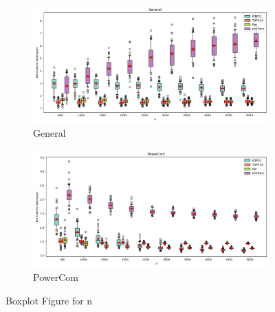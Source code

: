 \documentclass{article}
\begin{document}
\begin{figure}[htbp]
\\[2ex]
\begin{subfigure}[b]{0.32\textwidth}\includegraphics[width=\textwidth]{Results/n/n_General_boxplot}\caption{General}\label{fig:boxplot_figures_n_General}\end{subfigure}
\hfill
\begin{subfigure}[b]{0.32\textwidth}\includegraphics[width=\textwidth]{Results/n/n_PowerCom_boxplot}\caption{PowerCom}\label{fig:boxplot_figures_n_PowerCom}\end{subfigure}
\hfill
\caption{Boxplot Figure for n}
\label{fig:boxplot_figures_n}
\end{figure}
\end{document}

